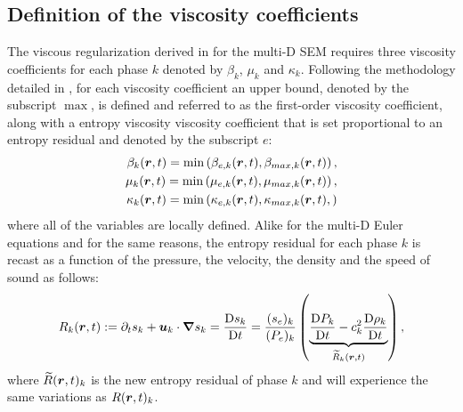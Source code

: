 \subsection{Definition of the viscosity coefficients}\label{sec:visc-coeff-sem}
The viscous regularization derived in  for the multi-D SEM requires three viscosity coefficients for each phase $k$ denoted by $\beta_k$, $\mu_k$ and $\kappa_k$. Following the methodology detailed in , for each viscosity coefficient an upper bound, denoted by the subscript $\max$, is defined and referred to as the first-order viscosity coefficient, along with a entropy viscosity viscosity coefficient that is set proportional to an entropy residual and denoted by the subscript $e$:
%
\begin{align}\label{eq:def-visc-sem-sct4}
\beta_k( \boldsymbol r, t) = \min \left( \beta_{e,k}( \boldsymbol r, t), \beta_{max,k} ( \boldsymbol r, t) \right), \nonumber \\
\mu_k( \boldsymbol r, t) = \min \left( \mu_{e,k}( \boldsymbol r, t), \mu_{max,k} ( \boldsymbol r, t) \right), \nonumber \\
\kappa_k( \boldsymbol r, t) = \min \left( \kappa_{e,k}( \boldsymbol r, t), \kappa_{max,k} ( \boldsymbol r, t), \right) \nonumber
\end{align}
% 
where all of the variables are locally defined. Alike for the multi-D Euler equations and for the same reasons, the entropy residual for each phase $k$ is recast as a function of the pressure, the velocity, the density and the speed of sound as follows:
%
\begin{equation}\label{eq:ent_res-sem-sct4}
R_k(\boldsymbol r,t) := \partial_t s_k + \boldsymbol u_k \cdot \boldsymbol{\nabla} s_k = \frac{\textrm{D} s_k}{\textrm{D} t} = \frac{(s_e)_k}{(P_e)_k} \left( \underbrace{\frac{\textrm{D} P_k}{\textrm{D} t} - c_k^2 \frac{\textrm{D} \rho_k}{\textrm{D} t} }_{\widetilde{R}_k(\boldsymbol r,t)} \right) ,
\end{equation} 
%
where $\widetilde{R}(\boldsymbol r,t)_k$ is the new entropy residual of phase $k$ and will experience the same variations as $R(\boldsymbol r,t)_k$. 

